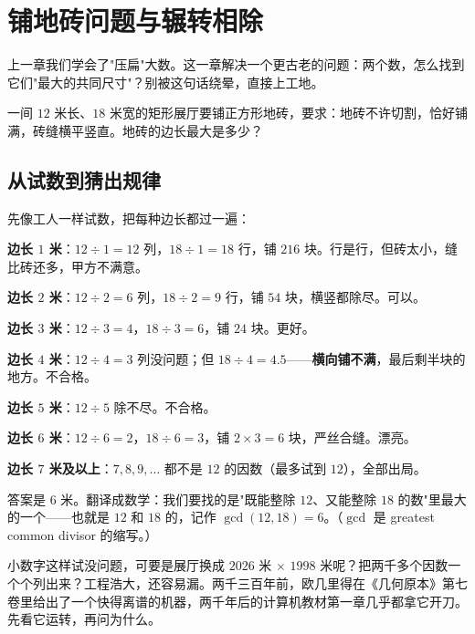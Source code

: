 \chapter{铺地砖问题与辗转相除}

上一章我们学会了"压扁"大数。这一章解决一个更古老的问题：两个数，怎么找到它们"最大的共同尺寸"？别被这句话绕晕，直接上工地。

\begin{kaiwei}
一间 $12$ 米长、$18$ 米宽的矩形展厅要铺正方形地砖，要求：地砖不许切割，恰好铺满，砖缝横平竖直。地砖的边长最大是多少？
\end{kaiwei}

\section{从试数到猜出规律}

先像工人一样试数，把每种边长都过一遍：

\textbf{边长 $1$ 米}：$12 \div 1 = 12$ 列，$18 \div 1 = 18$ 行，铺 $216$ 块。行是行，但砖太小，缝比砖还多，甲方不满意。

\textbf{边长 $2$ 米}：$12 \div 2 = 6$ 列，$18 \div 2 = 9$ 行，铺 $54$ 块，横竖都除尽。可以。

\textbf{边长 $3$ 米}：$12 \div 3 = 4$，$18 \div 3 = 6$，铺 $24$ 块。更好。

\textbf{边长 $4$ 米}：$12 \div 4 = 3$ 列没问题；但 $18 \div 4 = 4.5$——\textbf{横向铺不满}，最后剩半块的地方。不合格。

\textbf{边长 $5$ 米}：$12 \div 5$ 除不尽。不合格。

\textbf{边长 $6$ 米}：$12 \div 6 = 2$，$18 \div 6 = 3$，铺 $2\times 3 = 6$ 块，严丝合缝。漂亮。

\textbf{边长 $7$ 米及以上}：$7, 8, 9, \dots$ 都不是 $12$ 的因数（最多试到 $12$），全部出局。

答案是 $\boxed{6}$ 米。翻译成数学：我们要找的是"既能整除 $12$、又能整除 $18$ 的数"里最大的一个——也就是 $12$ 和 $18$ 的，记作 $\gcd(12, 18) = 6$。（$\gcd$ 是 greatest common divisor 的缩写。）

小数字这样试没问题，可要是展厅换成 $2026$ 米 $\times$ $1998$ 米呢？把两千多个因数一个个列出来？工程浩大，还容易漏。两千三百年前，欧几里得在《几何原本》第七卷里给出了一个快得离谱的机器，两千年后的计算机教材第一章几乎都拿它开刀。先看它运转，再问为什么。

